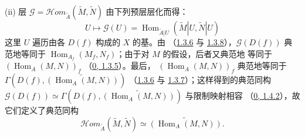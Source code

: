 \documentclass[UTF8,fontset=none,11pt,oneside,openany]{ctexbook}
\begin{document}
\begingroup
\setlength{\emergencystretch}{4em}
(ii) 层
$\mathscr{G}=\mathscr{H}\!om_{\widetilde{A}}(\widetilde{M},\widetilde{N})$
由下列预层层化而得：
\[
  U\longmapsto\mathscr{G}(U)
  =\operatorname{Hom}_{\widetilde{A}|U}
  (\widetilde{M}|U,\widetilde{N}|U)
\]
这里 $U$ 遍历由各 $D(f)$ 构成的 $X$ 的基。由
（\hyperref[I.1.3.6-fr]{1.3.6} 与
\hyperref[I.1.3.8-fr]{1.3.8}），$\mathscr{G}(D(f))$ 典范地等同于
$\operatorname{Hom}_{A_f}(M_f,N_f)$；由于对 $M$ 的假设，后者又典范地
等同于 $(\operatorname{Hom}_A(M,N))_f$
（\hyperref[0.1.3.5-fr]{0, 1.3.5}）。最后，
$(\operatorname{Hom}_A(M,N))_f$ 典范地等同于
$\Gamma(D(f),\widetilde{(\operatorname{Hom}_A(M,N))})$
（\hyperref[I.1.3.6-fr]{1.3.6} 与
\hyperref[I.1.3.7-fr]{1.3.7}）；这样得到的典范同构
$\mathscr{G}(D(f))\simeq
\Gamma(D(f),\widetilde{(\operatorname{Hom}_A(M,N))})$ 与限制映射相容
（\hyperref[0.1.4.2-fr]{0, 1.4.2}），故它们定义了典范同构
\[
  \mathscr{H}\!om_{\widetilde{A}}(\widetilde{M},\widetilde{N})
  \simeq\widetilde{(\operatorname{Hom}_A(M,N))}.
\]
\endgroup
\end{document}
